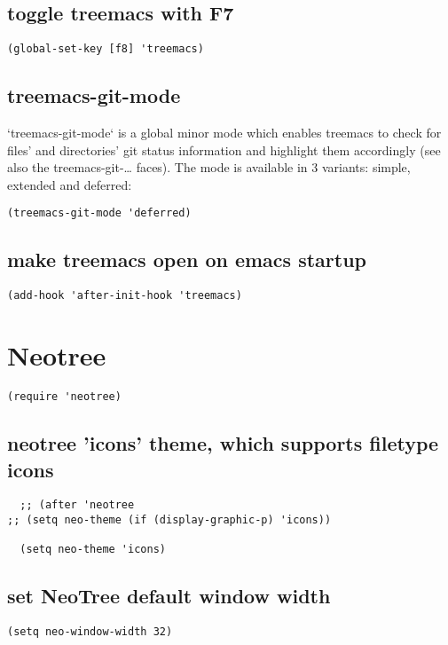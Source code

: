 \documentclass[11pt]{article}
\begin{document}
\subsection*{toggle treemacs with F7}
\label{sec:orgc7658e6}
\begin{verbatim}
(global-set-key [f8] 'treemacs)
\end{verbatim}

\subsection*{treemacs-git-mode}
\label{sec:orgf613e03}
`treemacs-git-mode` is a global minor mode which enables treemacs to check for files’ and directories’ git status information and highlight them accordingly (see also the treemacs-git-\ldots{} faces). The mode is available in 3 variants: simple, extended and deferred:

\begin{verbatim}
(treemacs-git-mode 'deferred) 
\end{verbatim}


\subsection*{make treemacs open on emacs startup}
\label{sec:org6ff7d9a}
\begin{verbatim}
(add-hook 'after-init-hook 'treemacs)
\end{verbatim}


\section*{Neotree}
\label{sec:org494f5b3}

\begin{verbatim}
(require 'neotree)
\end{verbatim}

\subsection*{neotree 'icons' theme, which supports filetype icons}
\label{sec:org4fa32e6}
\begin{verbatim}
  ;; (after 'neotree
;; (setq neo-theme (if (display-graphic-p) 'icons))

  (setq neo-theme 'icons)
\end{verbatim}


\subsection*{set NeoTree default window width}
\label{sec:orgf0462c3}
\begin{verbatim}
(setq neo-window-width 32)
\end{verbatim}
\end{document}
